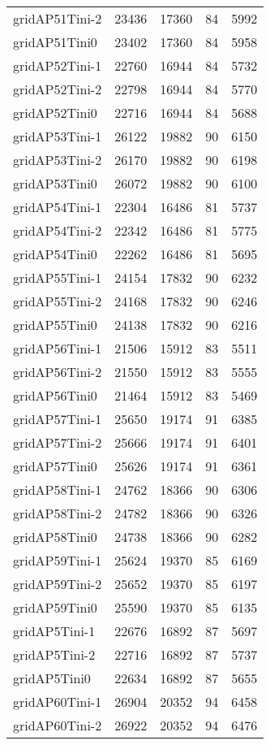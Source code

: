 \begin{tabular}{lrrrr}
gridAP51Tini-2 & 23436 & 17360 & 84 & 5992 \\
gridAP51Tini0 & 23402 & 17360 & 84 & 5958 \\
gridAP52Tini-1 & 22760 & 16944 & 84 & 5732 \\
gridAP52Tini-2 & 22798 & 16944 & 84 & 5770 \\
gridAP52Tini0 & 22716 & 16944 & 84 & 5688 \\
gridAP53Tini-1 & 26122 & 19882 & 90 & 6150 \\
gridAP53Tini-2 & 26170 & 19882 & 90 & 6198 \\
gridAP53Tini0 & 26072 & 19882 & 90 & 6100 \\
gridAP54Tini-1 & 22304 & 16486 & 81 & 5737 \\
gridAP54Tini-2 & 22342 & 16486 & 81 & 5775 \\
gridAP54Tini0 & 22262 & 16486 & 81 & 5695 \\
gridAP55Tini-1 & 24154 & 17832 & 90 & 6232 \\
gridAP55Tini-2 & 24168 & 17832 & 90 & 6246 \\
gridAP55Tini0 & 24138 & 17832 & 90 & 6216 \\
gridAP56Tini-1 & 21506 & 15912 & 83 & 5511 \\
gridAP56Tini-2 & 21550 & 15912 & 83 & 5555 \\
gridAP56Tini0 & 21464 & 15912 & 83 & 5469 \\
gridAP57Tini-1 & 25650 & 19174 & 91 & 6385 \\
gridAP57Tini-2 & 25666 & 19174 & 91 & 6401 \\
gridAP57Tini0 & 25626 & 19174 & 91 & 6361 \\
gridAP58Tini-1 & 24762 & 18366 & 90 & 6306 \\
gridAP58Tini-2 & 24782 & 18366 & 90 & 6326 \\
gridAP58Tini0 & 24738 & 18366 & 90 & 6282 \\
gridAP59Tini-1 & 25624 & 19370 & 85 & 6169 \\
gridAP59Tini-2 & 25652 & 19370 & 85 & 6197 \\
gridAP59Tini0 & 25590 & 19370 & 85 & 6135 \\
gridAP5Tini-1 & 22676 & 16892 & 87 & 5697 \\
gridAP5Tini-2 & 22716 & 16892 & 87 & 5737 \\
gridAP5Tini0 & 22634 & 16892 & 87 & 5655 \\
gridAP60Tini-1 & 26904 & 20352 & 94 & 6458 \\
gridAP60Tini-2 & 26922 & 20352 & 94 & 6476 \\

\end{tabular}
